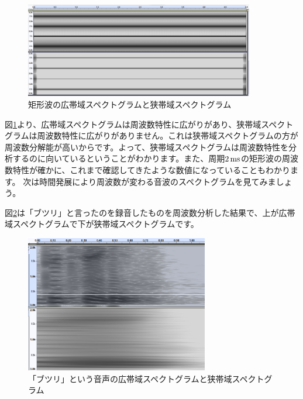 \documentclass[11pt,b5paper,papersize,dvipdfmx]{jsbook}
\begin{document}
\begin{figure}[H]
    \begin{center}
      \includegraphics[width=10cm]{nsmr/img/timekukeiha.png}
    \end{center}
    \caption{矩形波の広帯域スペクトグラムと狭帯域スペクトグラム}
    \label{fig:sema}
\end{figure}
図\ref{fig:sema}より、広帯域スペクトグラムは周波数特性に広がりがあり、狭帯域スペクトグラムは周波数特性に広がりがありません。これは狭帯域スペクトグラムの方が周波数分解能が高いからです。よって、狭帯域スペクトグラムは周波数特性を分析するのに向いているということがわかります。また、周期$2\tani{ms}$の矩形波の周波数特性が確かに、これまで確認してきたような数値になっていることもわかります。
次は時間発展により周波数が変わる音波のスペクトグラムを見てみましょう。\par
図\ref{fig:kukeisema}は「ブツリ」と言ったのを録音したものを周波数分析した結果で、上が広帯域スペクトグラムで下が狭帯域スペクトグラムです。

\begin{figure}[H]
    \begin{center}
      \includegraphics[width=8cm]{nsmr/img/saybuturi.png}
    \end{center}
    \caption{「ブツリ」という音声の広帯域スペクトグラムと狭帯域スペクトグラム}
    \label{fig:kukeisema}
\end{figure}
\end{document}
